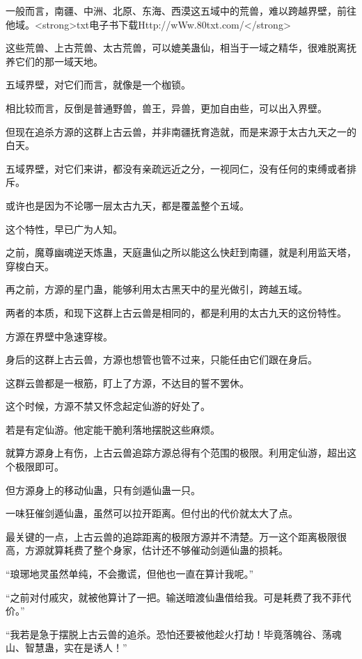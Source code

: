 
\begin{this_body}

一般而言，南疆、中洲、北原、东海、西漠这五域中的荒兽，难以跨越界壁，前往他域。<strong>txt电子书下载Http://wWw.80txt.com/</strong>

这些荒兽、上古荒兽、太古荒兽，可以媲美蛊仙，相当于一域之精华，很难脱离抚养它们的那一域天地。

五域界壁，对它们而言，就像是一个枷锁。

相比较而言，反倒是普通野兽，兽王，异兽，更加自由些，可以出入界壁。

但现在追杀方源的这群上古云兽，并非南疆抚育造就，而是来源于太古九天之一的白天。

五域界壁，对它们来讲，都没有亲疏远近之分，一视同仁，没有任何的束缚或者排斥。

或许也是因为不论哪一层太古九天，都是覆盖整个五域。

这个特性，早已广为人知。

之前，魔尊幽魂逆天炼蛊，天庭蛊仙之所以能这么快赶到南疆，就是利用监天塔，穿梭白天。

再之前，方源的星门蛊，能够利用太古黑天中的星光做引，跨越五域。

两者的本质，和现下这群上古云兽是相同的，都是利用的太古九天的这份特性。

方源在界壁中急速穿梭。

身后的这群上古云兽，方源也想管也管不过来，只能任由它们跟在身后。

这群云兽都是一根筋，盯上了方源，不达目的誓不罢休。

这个时候，方源不禁又怀念起定仙游的好处了。

若是有定仙游。他定能干脆利落地摆脱这些麻烦。

就算方源身上有伤，上古云兽追踪方源总得有个范围的极限。利用定仙游，超出这个极限即可。

但方源身上的移动仙蛊，只有剑遁仙蛊一只。

一味狂催剑遁仙蛊，虽然可以拉开距离。但付出的代价就太大了点。

最关键的一点，上古云兽的追踪距离的极限方源并不清楚。万一这个距离极限很高，方源就算耗费了整个身家，估计还不够催动剑遁仙蛊的损耗。

“琅琊地灵虽然单纯，不会撒谎，但他也一直在算计我呢。”

“之前对付戚灾，就被他算计了一把。输送暗渡仙蛊借给我。可是耗费了我不菲代价。”

“我若是急于摆脱上古云兽的追杀。恐怕还要被他趁火打劫！毕竟落魄谷、荡魂山、智慧蛊，实在是诱人！”


\end{this_body}
